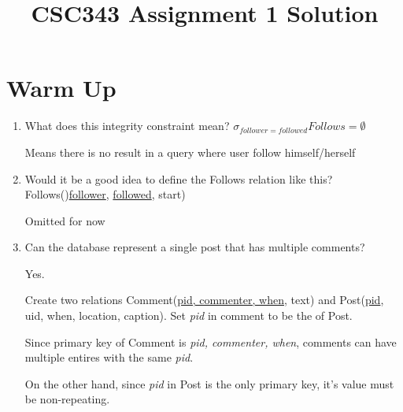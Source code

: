\documentclass[12pt]{article}
\begin{document}
\title{CSC343 Assignment 1 Solution}
\maketitle

\section*{Warm Up}

\begin{enumerate}[1.]
    \item What does this integrity constraint mean? $\sigma_{follower=followed}Follows = \emptyset$

    \bigskip

    \begin{mdframed}
    Means there is no result in a query where user follow himself/herself
    \end{mdframed}

    \item Would it be a good idea to define the Follows relation like this? Follows()\underline{follower}, \underline{followed}, start)

    \bigskip

    \begin{mdframed}
    Omitted for now
    \end{mdframed}

    \item Can the database represent a single post that has multiple comments?

    \bigskip

    \begin{mdframed}
        Yes.

        \bigskip

        Create two relations Comment(\underline{pid, commenter, when}, text) and
        Post(\underline{pid}, uid, when, location, caption). Set \textit{pid} in
        comment to be the  of Post.

        \bigskip

        Since primary key of Comment is \textit{pid, commenter, when}, comments
        can have multiple entires with the same \textit{pid}.

        \bigskip

        On the other hand, since \textit{pid} in Post is the only primary key,
        it's value must be non-repeating.
    \end{mdframed}
\end{enumerate}
\end{document}

